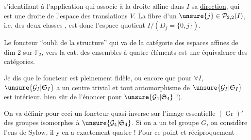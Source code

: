 s'identifiant à l'application qui associe à la droite affine dans $I$ sa
\uline{direction}, qui est une droite de l'espace des translations $V$.
La fibre d'un $\unsure{j}\in\mathcal{P}_{2,2}(I)$, i.e.  des
 deux classes , est donc
l'espace quotient $I/(D_j=\{0,j\})$.

Le foncteur ``oubli de la structure'' qui va de la catégorie des espaces affines
de dim 2 sur $\mathbb{F}_2$, vers la cat. des ensembles à quatre éléments
est une équivalence des catégories.

Je dis que le foncteur
est pleinement fidèle, ou encore que pour $\forall I$,
$\unsure{\mathcal{G}_I|\mathfrak{S}_I}$ a un centre trivial et tout automorphisme de
$\unsure{\mathcal{G}_I|\mathfrak{S}_I}$ est intérieur.
 bien sûr de l'énoncer pour $\unsure{\mathcal{G}_4|\mathfrak{S}_4}$ !).

On va définir pour ceci un foncteur quasi-inverse
sur l'image essentielle $(\operatorname{Gr})'$ des groupes isomorphes à
$\unsure{\mathcal{G}_4|\mathfrak{S}_4}$.
Si on a un tel groupe $G$, on considère l'ens
 de Sylow, il y en a exactement quatre !
Pour  ce point et réciproquement

